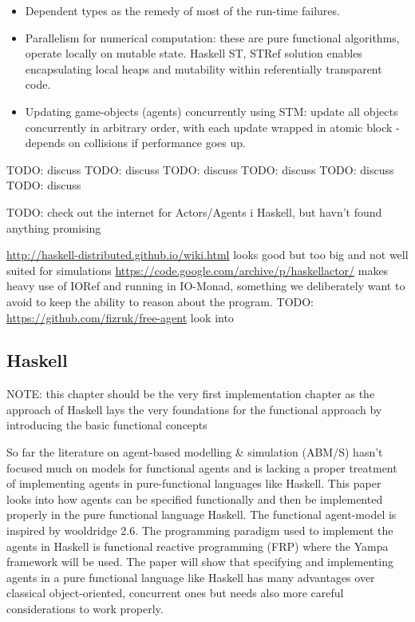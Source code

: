 \begin{itemize}
\item Dependent types as the remedy of most of the run-time failures.
\item Parallelism for numerical computation: these are pure functional algorithms, operate locally on mutable state. Haskell ST, STRef solution enables encapsulating local heaps and mutability within referentially transparent code.
\item Updating game-objects (agents) concurrently using STM: update all objects concurrently in arbitrary order, with each update wrapped in atomic block - depends on collisions if performance goes up.
\end{itemize}

TODO: discuss \cite{schneider_towards_2012}
TODO: discuss \cite{vendrov_frabjous:_2014}
TODO: discuss \cite{sulzmann_specifying_2007}
TODO: discuss \cite{jankovic_functional_2007}
TODO: discuss \cite{de_jong_suitability_2014}
TODO: discuss \cite{sorokin_aivika_2015}

TODO: check out the internet for Actors/Agents i Haskell, but havn't found anything promising

\url{http://haskell-distributed.github.io/wiki.html} looks good but too big and not well suited for simulations
\url{https://code.google.com/archive/p/haskellactor/} makes heavy use of IORef and running in IO-Monad, something we deliberately want to avoid to keep the ability to reason about the program.
TODO: \url{https://github.com/fizruk/free-agent} look into

\subsection{Haskell} 
NOTE: this chapter should be the very first implementation chapter as the approach of Haskell lays the very foundations for the functional approach by introducing the basic functional concepts

So far the literature on agent-based modelling \& simulation (ABM/S) hasn't focused much on models for functional agents and is lacking a proper treatment of implementing agents in pure-functional languages like Haskell. This paper looks into how agents can be specified functionally and then be implemented properly in the pure functional language Haskell. The functional agent-model is inspired by wooldridge 2.6. The programming paradigm used to implement the agents in Haskell is functional reactive programming (FRP) where the Yampa framework will be used. The paper will show that specifying and implementing agents in a pure functional language like Haskell has many advantages over classical object-oriented, concurrent ones but needs also more careful considerations to work properly.

